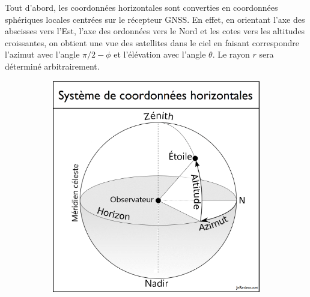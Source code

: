       Tout d'abord, les coordonnées horizontales sont converties en coordonnées sphériques locales centrées sur le récepteur GNSS\@.
      En effet, en orientant l'axe des abscisses vers l'Est, l'axe des ordonnées vers le Nord et les cotes vers les altitudes croissantes, on obtient une vue des satellites dans le ciel en faisant correspondre l'azimut avec l'angle $\pi/2 - \phi$ et l'élévation avec l'angle $\theta$.
      Le rayon $r$ sera déterminé arbitrairement.

       \begin{figure}[h]
             \centering
             \begin{subfigure}[h]{.45\textwidth}
                \centering
                \includegraphics[width=\textwidth]{imgs/horizon}
             \end{subfigure}
             \hfill
             \begin{subfigure}[h]{.45\textwidth}
                \centering

\end{subfigure}
\end{figure}
